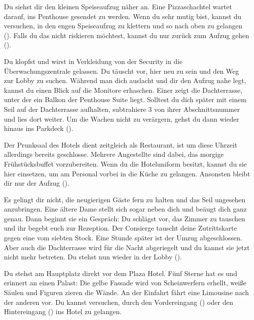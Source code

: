 {	%
	 Du siehst dir den kleinen Speiseaufzug näher an. Eine Pizzaschachtel wartet darauf, ins Penthouse gesendet zu werden. Wenn du sehr mutig bist, kannst du versuchen, in den engen Speiseaufzug zu klettern und so nach oben zu gelangen (). Falls du das nicht riskieren möchtest, kannst du nur zurück zum Aufzug gehen ().

	 Du klopfst und wirst in Verkleidung von der Security in die Überwachungszentrale gelassen. Du täuscht vor, hier neu zu sein und den Weg zur Lobby zu suchen. Während man dich auslacht und dir den Aufzug nahe legt, kannst du einen Blick auf die Monitore erhaschen. Einer zeigt die Dachterrasse, unter der ein Balkon der Penthouse Suite liegt. Solltest du dich später mit einem Seil auf der Dachterrasse aufhalten, subtrahiere 3 von ihrer Abschnittsnummer und lies dort weiter. Um die Wachen nicht zu verärgern, gehst du dann wieder hinaus ins Parkdeck ().

	 Der Prunksaal des Hotels dient zeitgleich als Restaurant, ist um diese Uhrzeit allerdings bereits geschlosse. Mehrere Angestellte sind dabei, das morgige Frühstücksbuffet vorzubereiten. Wenn du die Hoteluniform besitzt, kannst du sie hier einsetzen, um am Personal vorbei in die Küche zu gelangen. Ansonsten bleibt dir nur der Aufzug ().

		 Es gelingt dir nicht, die neugierigen Gäste fern zu halten und das Seil ungesehen anzubringen. Eine ältere Dame stellt sich sogar neben dich und beäugt dich ganz genau. Dann beginnt sie ein Gespräch:  Du schlägst vor, das Zimmer zu tauschen und ihr begebt euch zur Rezeption. Der Consierge tauscht deine Zutrittskarte gegen eine vom siebten Stock. Eine Stunde später ist der Umzug abgeschlossen. Aber auch die Dachterrasse wird für die Nacht abgeriegelt und du kannst sie jetzt nicht mehr betreten. Du stehst nun wieder in der Lobby ().

		 Du stehst am Hauptplatz direkt vor dem Plaza Hotel. Fünf Sterne hat es und erinnert an einen Palast: Die gelbe Fassade wird von Scheinwerfern erhellt, weiße Säulen und Figuren zieren die Wände. An der Einfahrt fährt eine Limousine nach der anderen vor. Du kannst versuchen, durch den Vordereingang () oder den Hintereingang () ins Hotel zu gelangen.

}
